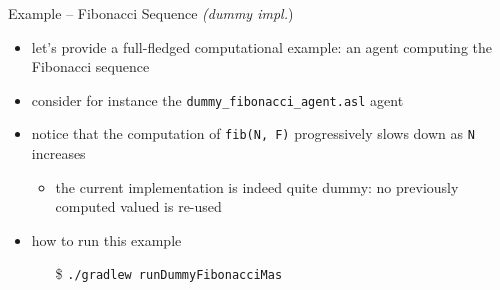 \documentclass[presentation]{beamer}\mode<presentation>{\usetheme{AMSBolognaFC}}
\begin{document}
\begin{frame}[c, allowframebreaks]{Example \theJasonExample{} -- Fibonacci Sequence \textit{(dummy impl.})}
    \begin{itemize}
        \item let's provide a full-fledged computational example: an agent computing the Fibonacci sequence
        
        \vspace{.3cm}
        
        \item consider for instance the \texttt{dummy\_fibonacci\_agent.asl} agent
        
        
        \vspace{.3cm}
        
        \item notice that the computation of \texttt{fib(N, F)} progressively slows down as \texttt{N} increases
         \begin{itemize}
             \item the current implementation is indeed quite dummy: no previously computed valued is re-used
         \end{itemize}
        
        \vspace{.3cm}
        
        \item how to run this example
        \begin{itemize}
            \item[\$] \texttt{./gradlew run\alert{DummyFibonacci}Mas}
        \end{itemize}
        
    \end{itemize}
\end{frame}
\end{document}
